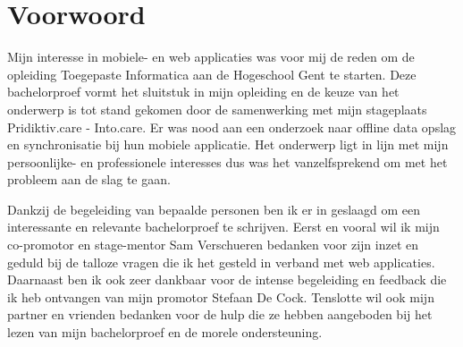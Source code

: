 
\chapter*{Voorwoord}
\label{ch:voorwoord}


Mijn interesse in mobiele- en web applicaties was voor mij de reden om de opleiding Toegepaste Informatica aan de Hogeschool Gent te starten. Deze bachelorproef vormt het sluitstuk in mijn opleiding en de keuze van het onderwerp is tot stand gekomen door de samenwerking met mijn stageplaats Pridiktiv.care - Into.care. Er was nood aan een onderzoek naar offline data opslag en synchronisatie bij hun mobiele applicatie. Het onderwerp ligt in lijn met mijn persoonlijke- en professionele interesses dus was het vanzelfsprekend om met het probleem aan de slag te gaan.

Dankzij de begeleiding van bepaalde personen ben ik er in geslaagd om een interessante en relevante bachelorproef te schrijven. Eerst en vooral wil ik mijn co-promotor en stage-mentor Sam Verschueren bedanken voor zijn inzet en geduld bij de talloze vragen die ik het gesteld in verband met web applicaties. Daarnaast ben ik ook zeer dankbaar voor de intense begeleiding en feedback die ik heb ontvangen van mijn promotor Stefaan De Cock. Tenslotte wil ook mijn partner en vrienden bedanken voor de hulp die ze hebben aangeboden bij het lezen van mijn bachelorproef en de morele ondersteuning.